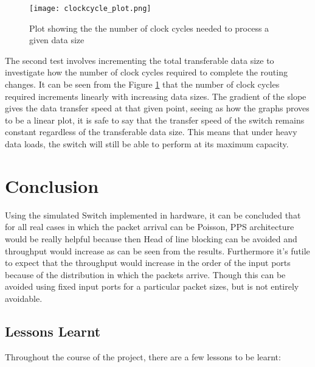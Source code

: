 \documentclass[twoside,12pt,fleqn]{book} %
\begin{document}
\begin{figure}[ht]
    \centering
    \texttt{[image: clockcycle\_plot.png]}
    \caption{Plot showing the the number of clock cycles needed to process a given data size}
    \label{fig:clock_cycle}
\end{figure}

The second test involves incrementing the total transferable data size to investigate how the number of clock cycles required to complete the routing changes. It can be seen from the Figure \ref{fig:clock_cycle} that the number of clock cycles required increments linearly with increasing data sizes. The gradient of the slope gives the data transfer speed at that given point, seeing as how the graphs proves to be a linear plot, it is safe to say that the transfer speed of the switch remains constant regardless of the transferable data size. This means that under heavy data loads, the switch will still be able to perform at its maximum capacity. 



\chapter{Conclusion}

Using the simulated Switch implemented in hardware, it can be concluded that for all real cases in which the packet arrival can be Poisson, PPS architecture would be really helpful because then Head of line blocking can be avoided and throughput would increase as can be seen from the results. Furthermore it's futile to expect that the throughput would increase in the order of the input ports because of the distribution in which the packets arrive. Though this can be avoided using fixed input ports for a particular packet sizes, but is not entirely avoidable.

\par 
\section{Lessons Learnt}

Throughout the course of the project, there are a few lessons to be learnt:
\end{document}
